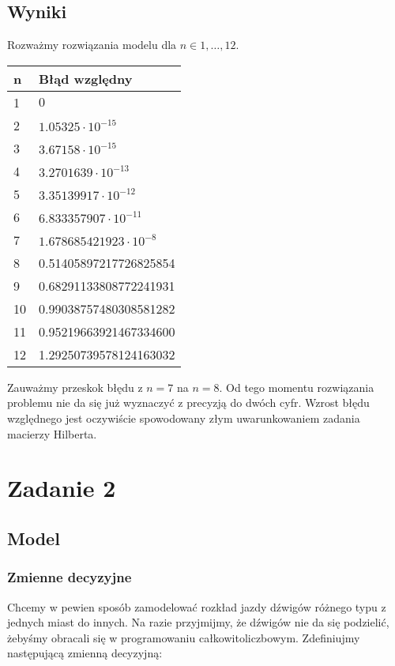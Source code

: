 \documentclass{article}
\theoremstyle{definition}
\theoremstyle{remark}
\theoremstyle{plain}
\theoremstyle{remark}
\theoremstyle{plain}
\begin{document}
\subsection{Wyniki}
Rozważmy rozwiązania modelu dla $n \in 1,\ldots,12$.
\begin{table}[H]
    \centering
    \begin{tabular}{|l|l|}\hline
    n & Błąd względny \\\hline
    1 & $0$\\\hline
    2 & $1.05325\cdot 10^{-15}$\\\hline
    3 & $3.67158\cdot 10^{-15}$\\\hline
    4 & $3.2701639\cdot 10^{-13}$\\\hline
    5 & $3.35139917\cdot 10^{-12}$\\\hline
    6 & $6.833357907\cdot 10^{-11}$\\\hline
    7 & $1.678685421923\cdot 10^{-8}$\\\hline
    8 & 0.51405897217726825854\\\hline
    9 & 0.68291133808772241931\\\hline
    10 & 0.99038757480308581282\\\hline
    11 & 0.95219663921467334600\\\hline
    12 & 1.29250739578124163032\\\hline
    \end{tabular}
\end{table}


Zauważmy przeskok błędu z $n = 7$ na $n = 8$. Od tego momentu rozwiązania problemu
nie da się już wyznaczyć z precyzją do dwóch cyfr. Wzrost błędu względnego jest 
oczywiście spowodowany złym uwarunkowaniem zadania macierzy Hilberta.
        
\section{Zadanie 2}
\subsection{Model}
\subsubsection{Zmienne decyzyjne}
Chcemy w pewien sposób zamodelować rozkład jazdy dźwigów różnego typu z jednych miast do innych.
Na razie przyjmijmy, że dźwigów nie da się podzielić, żebyśmy obracali się w programowaniu całkowitoliczbowym.
Zdefiniujmy następującą zmienną decyzyjną:
\end{document}
